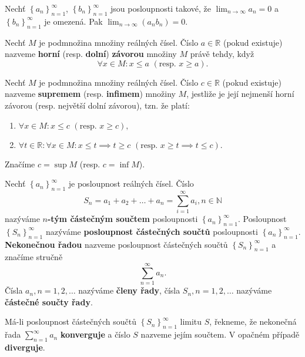 \begin{veta}
    Nechť $\left \{ a_n \right \}_{n=1}^\infty $, $\left \{ b_n \right \}_{n=1}^\infty $
    jsou posloupnosti takové, že $\lim_{n\to\infty}a_n=0$ a $\left \{ b_n \right \}_{n=1}^\infty $
    je omezená. Pak $\lim_{n\to\infty}\left ( a_nb_n \right ) =0.$
\end{veta}

\begin{definition}
Nechť $M$ je podmnožina množiny reálných čísel. Číslo $a\in \mathbb R$ (pokud existuje)
nazveme \textbf{horní} (resp. \textbf{dolní}) \textbf{závorou} množiny $M$ právě tehdy,
když
$$\forall x \in M:x\leq a \,\, (\textrm{resp. }x\geq a).$$
\end{definition}

\begin{definition}
Nechť $M$ je podmnožina množiny reálných čísel. Číslo $c\in \mathbb R$ (pokud existuje)
nazveme \textbf{supremem} (resp. \textbf{infimem}) množiny $M$, jestliže je její
nejmenší horní závorou (resp. největší dolní závorou), tzn. že platí:
\begin{enumerate}[$i.$]
\item $\forall x\in M:x\leq c \,\, (\textrm{resp. } x\geq c),$
\item $\forall t\in \mathbb R: \forall x\in  M:x\leq t \implies t\geq c \,\, (\textrm{resp. }x\geq t \implies t\leq c).$
\end{enumerate}
Značíme $c=\sup M$ (resp. $c=\inf M$).
\end{definition}

\begin{definition}
Nechť $\left \{ a_n \right \}_{n=1}^\infty $ je posloupnost reálných čísel. Číslo
$$S_n=a_1+a_2+\dots+a_n = \sum_{i=1}^\infty a_i, n\in \mathbb N$$
nazýváme \textbf{$n$-tým částečným součtem} posloupnosti $\left \{ a_n \right \}_{n=1}^\infty $.
Posloupnost $\left \{ S_n \right \}_{n=1}^\infty $ nazýváme \textbf{posloupnost
částečných součtů} posloupnosti $\left \{ a_n \right \}_{n=1}^\infty $.\\
\textbf{Nekonečnou řadou} nazveme posloupnost částečných součtů
$\left \{ S_n \right \}_{n=1}^\infty $ a značíme stručně
$$\sum_{n=1}^\infty a_n.$$
Čísla $a_n, n=1,2,\dots$ nazýváme \textbf{členy řady}, čísla $S_n, n=1,2,\dots$
nazýváme \textbf{částečné součty řady}.
\end{definition}

\begin{definition}
Má-li posloupnost částečných součtů $\left \{ S_n \right \}_{n=1}^\infty $
limitu $S$, řekneme, že nekonečná řada $\sum_{n=1}^\infty a_n$ \textbf{konverguje}
a číslo $S$ nazveme jejím součtem. V opačném případě \textbf{diverguje}.
\end{definition}

